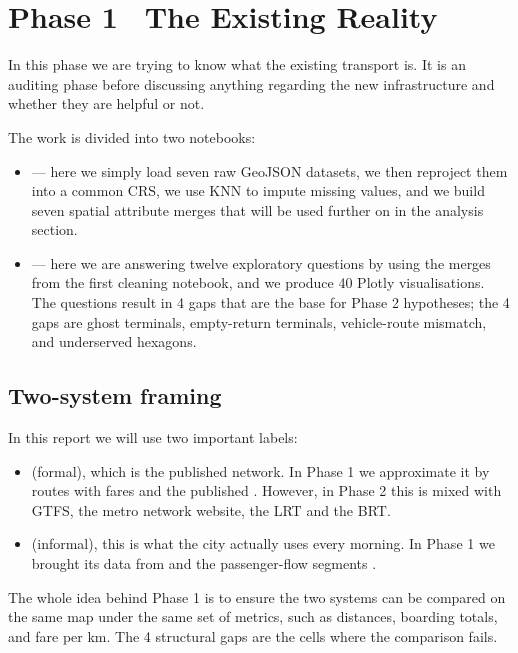 
\section{Phase 1 \textbullet\ The Existing Reality}
\label{sec:phase1-intro}

In this phase we are trying to know what the existing transport is.
It is an auditing phase before discussing anything regarding the new
infrastructure and whether they are helpful or not.

The work is divided into two notebooks:

\begin{itemize}
  \item {} — here we simply load seven raw
        GeoJSON datasets, we then reproject them into a common CRS,
        we use KNN to impute missing values, and we build seven
        spatial attribute merges that will be used further on in the
        analysis section.
  \item {} — here we are answering twelve
        exploratory questions by using the merges from the first
        cleaning notebook, and we produce 40 Plotly visualisations.
        The questions result in 4 gaps that are the base for Phase 2
        hypotheses; the 4 gaps are ghost terminals, empty-return
        terminals, vehicle-route mismatch, and underserved hexagons.
\end{itemize}

\subsection{Two-system framing}

In this report we will use two important labels:

\begin{itemize}
  \item {} (formal), which is the published network. In
        Phase 1 we approximate it by routes with fares and the
        published . However, in
        Phase 2 this is mixed with GTFS, the metro network website,
        the LRT and the BRT.
  \item {} (informal), this is what the city actually uses
        every morning. In Phase 1 we brought its data from
         and the passenger-flow segments
        .
\end{itemize}

The whole idea behind Phase 1 is to ensure the two systems can be
compared on the same map under the same set of metrics, such as
distances, boarding totals, and fare per km. The 4 structural gaps are
the cells where the comparison fails.
